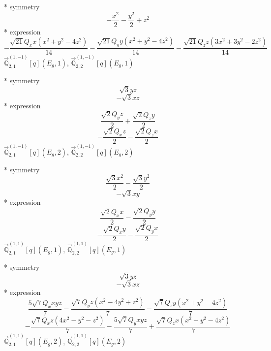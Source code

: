 \documentclass[fleqn,8pt]{jsarticle}
\begin{document}
\noindent\quad ** symmetry
\begin{dmath*}
- \frac{x^{2}}{2} - \frac{y^{2}}{2} + z^{2}
\end{dmath*}
\noindent\quad ** expression
\begin{dmath*}
- \frac{\sqrt{21} Q_{x} x \left(x^{2} + y^{2} - 4 z^{2}\right)}{14} - \frac{\sqrt{21} Q_{y} y \left(x^{2} + y^{2} - 4 z^{2}\right)}{14} - \frac{\sqrt{21} Q_{z} z \left(3 x^{2} + 3 y^{2} - 2 z^{2}\right)}{14}
\end{dmath*}
\noindent\quad $\vec{\mathbb{Q}}_{2,1}^{(1,-1)}[q](E_{g},1)$, $\vec{\mathbb{Q}}_{2,2}^{(1,-1)}[q](E_{g},1)$

\noindent\quad ** symmetry
\begin{dmath*}
\sqrt{3} y z
\end{dmath*}
\begin{dmath*}
- \sqrt{3} x z
\end{dmath*}
\noindent\quad ** expression
\begin{dmath*}
\frac{\sqrt{2} Q_{y} z}{2} + \frac{\sqrt{2} Q_{z} y}{2}
\end{dmath*}
\begin{dmath*}
- \frac{\sqrt{2} Q_{x} z}{2} - \frac{\sqrt{2} Q_{z} x}{2}
\end{dmath*}
\noindent\quad $\vec{\mathbb{Q}}_{2,1}^{(1,-1)}[q](E_{g},2)$, $\vec{\mathbb{Q}}_{2,2}^{(1,-1)}[q](E_{g},2)$

\noindent\quad ** symmetry
\begin{dmath*}
\frac{\sqrt{3} x^{2}}{2} - \frac{\sqrt{3} y^{2}}{2}
\end{dmath*}
\begin{dmath*}
- \sqrt{3} x y
\end{dmath*}
\noindent\quad ** expression
\begin{dmath*}
\frac{\sqrt{2} Q_{x} x}{2} - \frac{\sqrt{2} Q_{y} y}{2}
\end{dmath*}
\begin{dmath*}
- \frac{\sqrt{2} Q_{x} y}{2} - \frac{\sqrt{2} Q_{y} x}{2}
\end{dmath*}
\noindent\quad $\vec{\mathbb{Q}}_{2,1}^{(1,1)}[q](E_{g},1)$, $\vec{\mathbb{Q}}_{2,2}^{(1,1)}[q](E_{g},1)$

\noindent\quad ** symmetry
\begin{dmath*}
\sqrt{3} y z
\end{dmath*}
\begin{dmath*}
- \sqrt{3} x z
\end{dmath*}
\noindent\quad ** expression
\begin{dmath*}
\frac{5 \sqrt{7} Q_{x} x y z}{7} - \frac{\sqrt{7} Q_{y} z \left(x^{2} - 4 y^{2} + z^{2}\right)}{7} - \frac{\sqrt{7} Q_{z} y \left(x^{2} + y^{2} - 4 z^{2}\right)}{7}
\end{dmath*}
\begin{dmath*}
- \frac{\sqrt{7} Q_{x} z \left(4 x^{2} - y^{2} - z^{2}\right)}{7} - \frac{5 \sqrt{7} Q_{y} x y z}{7} + \frac{\sqrt{7} Q_{z} x \left(x^{2} + y^{2} - 4 z^{2}\right)}{7}
\end{dmath*}
\noindent\quad $\vec{\mathbb{Q}}_{2,1}^{(1,1)}[q](E_{g},2)$, $\vec{\mathbb{Q}}_{2,2}^{(1,1)}[q](E_{g},2)$
\end{document}
